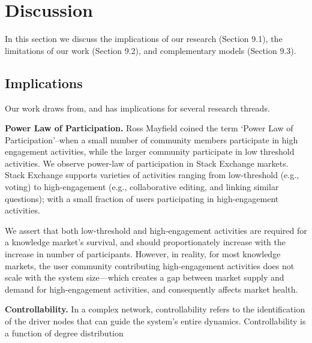 \section{Discussion}
In this section we discuss the implications of our research (Section 9.1), the limitations of our work (Section 9.2), and  complementary models (Section 9.3).

\subsection{Implications}
Our work draws from, and has implications for several research threads.

\textbf{Power Law of Participation.} Ross Mayfield coined the term \lq Power Law of Participation\rq\---when a small number of community members participate in high engagement activities, while the larger community participate in low threshold activities. We observe power-law of participation in Stack Exchange markets. Stack Exchange supports varieties of activities ranging from low-threshold (e.g., voting) to high-engagement (e.g., collaborative editing, and linking similar questions); with a small fraction of users participating in high-engagement activities. 

We assert that both low-threshold and high-engagement activities are required for a knowledge market's survival, and should proportionately increase with the increase in number of participants. However, in reality, for most knowledge markets, the user community contributing high-engagement activities does not scale with the system size---which creates a gap between market supply and demand for high-engagement activities, and consequently affects market health. 


\textbf{Controllability.}
In a complex network, controllability refers to the identification of the driver nodes that can guide the system’s entire dynamics. Controllability is a function of degree distribution 

